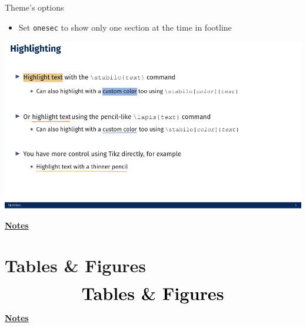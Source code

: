 \documentclass[10pt]{beamer}
\begin{document}
\begin{frame}
    {Theme's options}
    \begin{itemize}
        \item Set \texttt{onesec} to show only one section at the time in footline
    \end{itemize}
    \begin{center}
        \begin{minipage}[b]{.6\textwidth}
            \includegraphics[width=\textwidth]{onesec}
        \end{minipage}
    \end{center}
\end{frame}
\begin{flushleft}
    \underline{\textbf{Notes}}\setlength{\parskip}{.15cm}\notesize\newline\par
\end{flushleft}

\section{Tables \& Figures}
\begin{frame}
    \begin{eqnarray*}
        &\text{{\huge \textbf{Tables \& Figures}}}\\
    \end{eqnarray*}
\end{frame}
\begin{flushleft}
    \underline{\textbf{Notes}}\setlength{\parskip}{.15cm}\notesize\newline\par
\end{flushleft}
\end{document}
